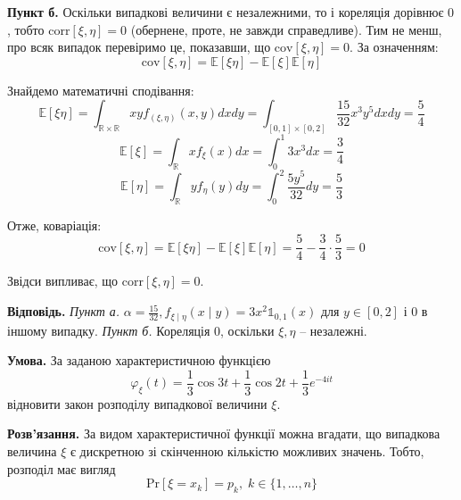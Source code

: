 \documentclass[oneside,solution]{karazin-prob-theory-assign}
\begin{document}
\textbf{Пункт б.} Оскільки випадкові величини є незалежними, то і кореляція дорівнює $0$, тобто $\text{corr}[\xi,\eta] = 0$ (обернене, проте, не завжди справедливе). Тим не менш, про всяк випадок перевіримо це, показавши, що $\text{cov}[\xi,\eta]=0$. За означенням:
\begin{equation}
    \text{cov}[\xi,\eta] = \mathbb{E}[\xi\eta] - \mathbb{E}[\xi]\mathbb{E}[\eta]
\end{equation}

Знайдемо математичні сподівання:
\begin{equation}
    \mathbb{E}[\xi\eta] = \int_{\mathbb{R} \times \mathbb{R}}xyf_{(\xi,\eta)}(x,y)dxdy = \int_{[0,1]\times [0,2]}\frac{15}{32}x^3y^5dxdy = \frac{5}{4}
\end{equation}
\begin{equation}
    \mathbb{E}[\xi] = \int_{\mathbb{R}}xf_{\xi}(x)dx = \int_0^1 3x^3dx = \frac{3}{4}
\end{equation}
\begin{equation}
    \mathbb{E}[\eta] = \int_{\mathbb{R}}yf_{\eta}(y)dy = \int_0^2 \frac{5y^5}{32}dy = \frac{5}{3}
\end{equation}

Отже, коваріація:
\begin{equation}
    \text{cov}[\xi,\eta] = \mathbb{E}[\xi\eta] - \mathbb{E}[\xi]\mathbb{E}[\eta] = \frac{5}{4} - \frac{3}{4} \cdot \frac{5}{3} = 0
\end{equation}

Звідси випливає, що $\text{corr}[\xi,\eta]=0$.

\textbf{Відповідь.} \textit{Пункт а.} $\alpha=\frac{15}{32},f_{\xi\mid\eta}(x\mid y) = 3x^2\mathds{1}_{0,1}(x)$ для $y \in [0,2]$ і 0 в іншому випадку. \textit{Пункт б.} Кореляція $0$, оскільки $\xi,\eta$ -- незалежні.


\hspace{20px}\textbf{Умова.} За заданою характеристичною функцією 
\begin{equation*}
\varphi_{\xi}(t) = \frac{1}{3}\cos 3t + \frac{1}{3}\cos 2t + \frac{1}{3}e^{-4it}
\end{equation*}
відновити закон розподілу випадкової величини $\xi$.

\textbf{Розв'язання.} За видом характеристичної функції можна вгадати, що випадкова величина $\xi$ є дискретною зі скінченною кількістю можливих значень. Тобто, розподіл має вигляд
\begin{equation}
    \text{Pr}[\xi = x_k] = p_k, \; k \in \{1,\dots,n\}
\end{equation}
\end{document}
